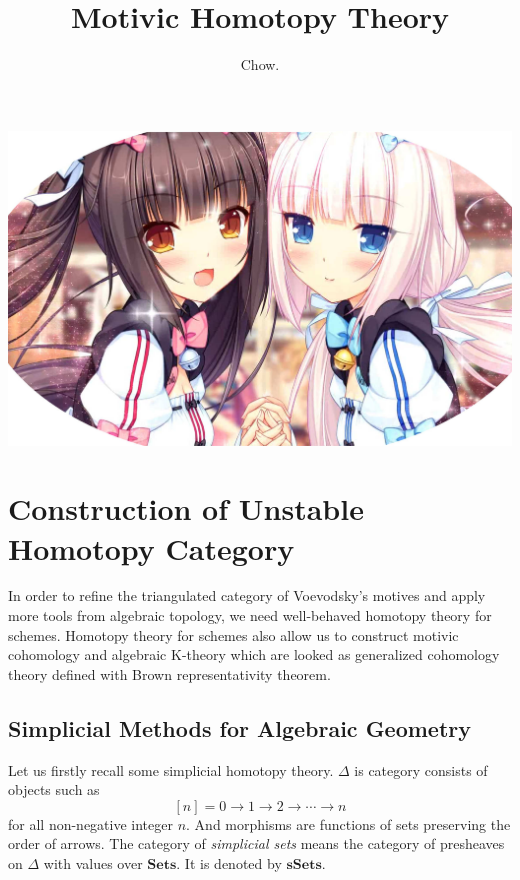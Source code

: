\documentclass[b5paper,10pt]{article}
\title{Motivic Homotopy Theory}
\author{Chow.}
\date{}
\begin{document}
\maketitle
\begin{center}
	\centering\includegraphics[scale=0.1]{PIC/NEKOPARA.jpg}
\end{center}
\tableofcontents
	\section{Construction of Unstable Homotopy Category}
	In order to refine the triangulated category of Voevodsky's motives and apply more tools from algebraic topology, we need well-behaved homotopy theory for schemes. Homotopy theory for schemes also allow us to construct motivic cohomology and algebraic K-theory which are looked as generalized cohomology theory defined with Brown representativity theorem.
	\subsection{Simplicial Methods for Algebraic Geometry}
	Let us firstly recall some simplicial homotopy theory.
	$\Delta$ is category consists of objects such as
	\[
	[n]={0 \to 1 \to 2 \to \cdots \to n}
	\]
	for all non-negative integer $n$. And morphisms are functions of sets preserving the order of arrows.
	The category of \emph{simplicial sets} means the category of presheaves on $\Delta$ with values over $\mathbf{Sets}$. It is denoted by $\mathbf{sSets}$.
	
\end{document}
